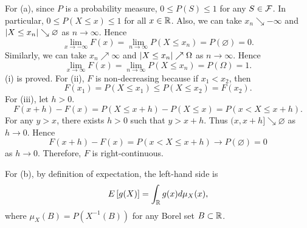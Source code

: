 \begin{solution}
    For (a), since $P$ is a probability measure, $0\leq P(S)\leq 1$ for any $S\in\mathcal{F}$. 
    In particular, $0\leq P(X\leq x)\leq 1$ for all $x\in\mathbb{R}$. Also, we can take 
    $x_n\searrow-\infty$ and $\left\lvert {X\leq x_n} \right\rvert\searrow\varnothing$ as $n\to\infty$. 
    Hence 
    \begin{equation*}
        \lim_{x\to-\infty} F(x) = \lim_{n\to\infty} P(X\leq x_n) = P(\varnothing) = 0.
    \end{equation*} 
    Similarly, we can take $x_n\nearrow\infty$ and $\left\lvert {X\leq x_n} \right\rvert\nearrow\Omega$ as
    $n\to\infty$. Hence
    \begin{equation*}
        \lim_{x\to\infty} F(x) = \lim_{n\to\infty} P(X\leq x_n) = P(\Omega) = 1.
    \end{equation*}
    (i) is proved. For (ii), $F$ is non-decreasing because if $x_1 < x_2$, then 
    \begin{equation*}
        F(x_1) = P(X\leq x_1) \leq P(X\leq x_2) = F(x_2).
    \end{equation*}
    For (iii), let $h>0$. 
    \begin{equation*}
        F(x+h) - F(x) = P(X\leq x+h) - P(X\leq x) = P(x < X \leq x+h).
    \end{equation*}
    For any $y>x$, there exists $h>0$ such that $y > x+h$. Thus $(x, x+h]\searrow\varnothing$ as $h\to 0$. 
    Hence 
    \begin{equation*}
        F(x+h) - F(x) = P(x < X \leq x+h) \to P(\varnothing) = 0
    \end{equation*}
    as $h\to 0$. Therefore, $F$ is right-continuous.

    For (b), by definition of expectation, the left-hand side is
    \begin{equation*}
        E\left[ {g(X)} \right] = \int_{\mathbb{R}} g(x) d\mu_X(x), 
    \end{equation*}
    where $\mu_X(B) = P(X^{-1}(B))$ for any Borel set $B\subset\mathbb{R}$.
\end{solution}